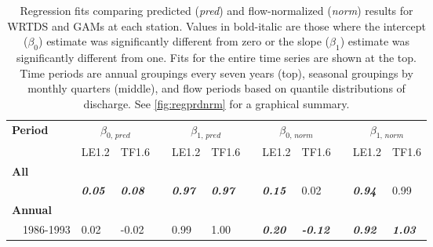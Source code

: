 \documentclass[letterpaper,12pt,oneside]{article}\usepackage[]{graphicx}\usepackage[]{color}
\begin{document}
\begin{table}[!tbp]
\caption{Regression fits comparing predicted ({\it pred}) and flow-normalized ({\it norm}) results for \ac{WRTDS} and \acp{GAM} at each station.  Values in bold-italic are those where the intercept ($\beta_0$) estimate was significantly different from zero or the slope ($\beta_{1}$) estimate was significantly different from one. Fits for the entire time series are shown at the top.  Time periods are annual groupings every seven years (top), seasonal groupings by monthly quarters (middle), and flow periods based on quantile distributions of discharge.  See \cref{fig:regprdnrm} for a graphical summary.\label{tab:regprdnrm}} 
\begin{center}
\begin{tabular}{lllcllcllcll}
\hline\hline
\multicolumn{1}{l}{\bfseries Period}&\multicolumn{2}{c}{\bfseries $\beta_{0,\,pred}$}&\multicolumn{1}{c}{\bfseries }&\multicolumn{2}{c}{\bfseries $\beta_{1,\,pred}$}&\multicolumn{1}{c}{\bfseries }&\multicolumn{2}{c}{\bfseries $\beta_{0,\,norm}$}&\multicolumn{1}{c}{\bfseries }&\multicolumn{2}{c}{\bfseries $\beta_{1,\,norm}$}\tabularnewline
\cline{2-3} \cline{5-6} \cline{8-9} \cline{11-12}
\multicolumn{1}{l}{}&\multicolumn{1}{c}{LE1.2}&\multicolumn{1}{c}{TF1.6}&\multicolumn{1}{c}{}&\multicolumn{1}{c}{LE1.2}&\multicolumn{1}{c}{TF1.6}&\multicolumn{1}{c}{}&\multicolumn{1}{c}{LE1.2}&\multicolumn{1}{c}{TF1.6}&\multicolumn{1}{c}{}&\multicolumn{1}{c}{LE1.2}&\multicolumn{1}{c}{TF1.6}\tabularnewline
\hline
{\bfseries All}&&&&&&&&&&&\tabularnewline
~~&{\bf \textit{0.05}}&{\bf \textit{0.08}}&&{\bf \textit{0.97}}&{\bf \textit{0.97}}&&{\bf \textit{0.15}}&0.02&&{\bf \textit{0.94}}&0.99\tabularnewline
\hline
{\bfseries Annual}&&&&&&&&&&&\tabularnewline
~~1986-1993&0.02&-0.02&&0.99&1.00&&{\bf \textit{0.20}}&{\bf \textit{-0.12}}&&{\bf \textit{0.92}}&{\bf \textit{1.03}}\tabularnewline

\end{tabular}
\end{center}
\end{table}
\end{document}
